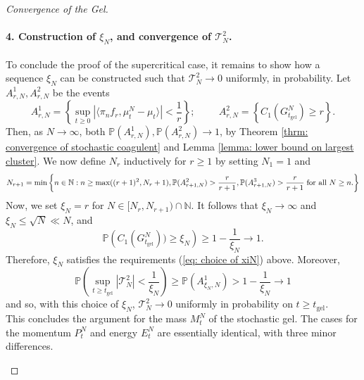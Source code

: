 \begin{proof}[Convergence of the Gel]
       \paragraph{4. Construction of $\xi_N$, and convergence of $\mathcal{T}^2_N$.} To conclude the proof of the supercritical case, it remains to show how a sequence $\xi_N$ can be constructed such that $\mathcal{T}^2_N \rightarrow 0$ uniformly, in probability. Let $A^1_{r,N}, A^2_{r,N}$ be the events \begin{equation} \label{eq: definition of A1rn}
       A^1_{r,N}=\left\{\sup_{t\geq 0} |\langle \pi_n f_r, \mu^N_t-\mu_t\rangle|<\frac{1}{r}\right\}; \hspace{1cm}
       A^2_{r,N}=\left\{C_1(G^N_{t_\text{gel}}) \geq r\right\}.
   \end{equation} Then, as $N\rightarrow \infty$, both $\mathbb{P}(A^1_{r,N}), \mathbb{P}(A^2_{r,N}) \rightarrow 1$, by Theorem \ref{thrm: convergence of stochastic coagulent} and Lemma \ref{lemma: lower bound on largest cluster}. We now define $N_r$ inductively for $r\geq 1$ by setting $N_1=1$ and \begin{equation}
       \label{eq: recursive definition of Nr} N_{r+1}=\min\left\{n \in \mathbb{N}: n\geq \max((r+1)^2, N_r+1),  \mathbb{P}(A^2_{r+1,N})>\frac{r}{r+1},  \mathbb{P}(A^3_{r+1,N})>\frac{r}{r+1} \hspace{0.1cm} \text{for all }N\geq n. \right\}
   \end{equation} Now, we set $\xi_N=r$ for $N\in [N_r, N_{r+1})\cap\mathbb{N}.$ It follows that $\xi_N \rightarrow \infty$ and $\xi_N\leq \sqrt{N}\ll N$, and \begin{equation}
       \mathbb{P}\left(C_1(G^N_{t_\text{gel}}))\geq \xi_N\right)\ge 1-\frac{1}{\xi_N} \rightarrow 1. 
   \end{equation} Therefore, $\xi_N$ satisfies the requirements (\ref{eq: choice of xiN}) above. Moreover, \begin{equation}
       \mathbb{P}\left(\sup_{t\geq t_\text{gel}} |\mathcal{T}^2_N| <\frac{1}{\xi_N}\right) \ge \mathbb{P}\left(A^1_{\xi_N,N}\right) > 1-\frac{1}{\xi_N}\rightarrow 1
   \end{equation} and so, with this choice of $\xi_N$, $\mathcal{T}^2_N \rightarrow 0$ uniformly in probability on $t\ge t_\text{gel}.$ \bigskip \\ This concludes the argument for the mass $M^N_t$ of the stochastic gel. The cases for the momentum $P^N_t$ and energy $E^N_t$ are essentially identical, with three minor differences. \begin{enumerate}[label=\roman{*}).]

\end{enumerate}
\end{proof}
